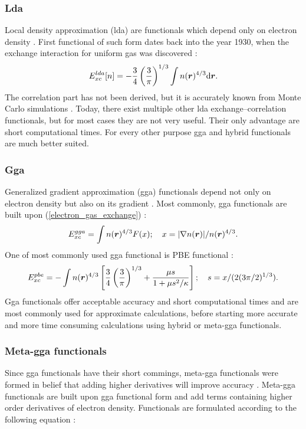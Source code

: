 \documentclass[openany, longbibliography,slovene,a4paper,12pt]{article}
\def\vec#1{\mbox{\boldmath$#1$}}
\newcommand{\dif}{\mathrm{d}}
\begin{document}
\subsubsection{Lda}
Local density approximation (lda) are functionals which depend only on
 electron density \cite{challenges_den_fun_theor, presc_desig_selec_densit_funct_approx}.
First functional of such form dates back into
the year 1930, when the exchange interaction for uniform gas was discovered
\cite{challenges_den_fun_theor} :
\begin{equation} \label{electron_gas_exchange}
E_{xc}^{lda}[n]=-\frac{3}{4}\left( \frac{3}{\pi} \right)^{1/3}\int n(\vec r)^{4/3} \dif \vec r.
\end{equation}
The correlation part has not been derived, but it is accurately known from Monte
Carlo simulations \cite{presc_desig_selec_densit_funct_approx}.
Today, there exist multiple other lda exchange--correlation functionals, but for most cases
they are not very useful. Their only advantage are short computational times.
For every other purpose gga and hybrid functionals are much better suited.

\subsubsection{Gga}
Generalized gradient approximation (gga) functionals
depend not only on electron density but also on its gradient
\cite{challenges_den_fun_theor}. Most commonly, gga functionals are built upon (\ref{electron_gas_exchange}) \cite{challenges_den_fun_theor}:
\begin{equation}
  E_{xc}^{gga}=\int n(\vec r)^{4/3}F(x);\quad x=|\nabla n(\vec r)|/n(\vec r)^{4/3}.
\end{equation}
One of most commonly used gga functional is PBE functional
\cite{challenges_den_fun_theor} \cite{challenges_den_fun_theor}:
\begin{equation}
  E_{xc}^{pbe}=-\int  n(\vec r)^{4/3}\left[ \frac{3}{4}\left(\frac{3}{\pi}\right)^{1/3} + \frac{\mu s}{1+ \mu s^2/\kappa} \right]; \quad s=x/(2(3\pi/2)^{1/3}).
\end{equation}
Gga functionals offer acceptable accuracy and short computational times and are
most commonly used for approximate calculations, before starting more accurate
and more time consuming calculations using hybrid or meta-gga functionals.

\subsubsection{Meta-gga functionals}
Since gga functionals have their short commings, meta-gga functionals were formed
in belief that adding higher derivatives will improve accuracy
\cite{challenges_den_fun_theor}. Meta-gga functionals are built upon gga
functional form and add terms containing higher order derivatives of electron
density. Functionals are formulated according to the following equation
\cite{challenges_den_fun_theor}:
\end{document}

